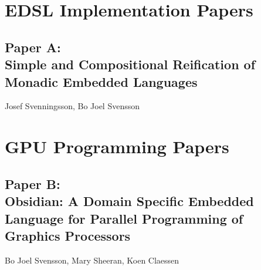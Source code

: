 \documentclass[a4paper]{book}
\newcommand{\paperA}{Paper A}
\newcommand{\paperATitle}{Simple and Compositional Reification of Monadic Embedded Languages}
\newcommand{\paperB}{Paper B}
\newcommand{\paperBTitle}{Obsidian: A Domain Specific Embedded Language for Parallel Programming of Graphics Processors}
\begin{document}
\chapter{EDSL Implementation Papers}
\label{chap:EDSLImplementation}
% 
\cleardoublepage 


\section[\paperATitle]{\paperA: \\ \paperATitle}
\label{sec:paperA}


\begin{center} 
Josef Svenningsson, Bo Joel Svensson
\end{center}






\chapter{GPU Programming Papers}
\label{chap:GPUProgramming}

% 
\cleardoublepage 

\section[\paperBTitle]{\paperB: \\ \paperBTitle}
\label{sec:paperB}


\begin{center} 
Bo Joel Svensson, Mary Sheeran, Koen Claessen
\end{center}



% 
\cleardoublepage 
\end{document}
